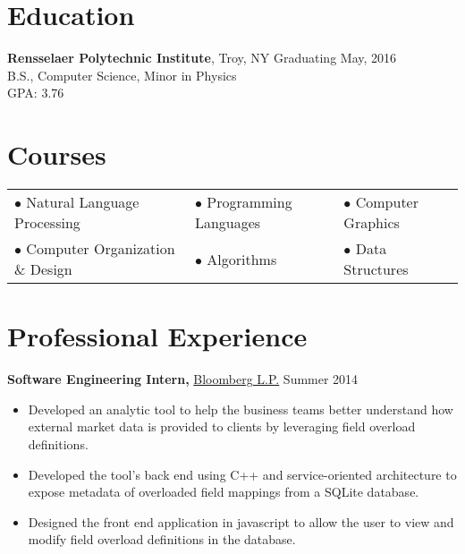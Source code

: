 \documentclass[margin]{res}
\begin{document}
 
\begin{minipage}{\textwidth}

 
\address{{\bf Present Address} \\ 2166 14th St \\ 2nd Floor \\ Troy, NY 12180 }
\address{{\bf Permanent Address} \\ 4 Oak Street \\ Cumberland, ME 04021 }
\begin{resume} 
 
\section{Education} 
{\bf Rensselaer Polytechnic Institute}, Troy, NY \hfill Graduating May, 2016 \\
B.S., Computer Science, Minor in Physics \\
GPA: 3.76
 
\section{Courses}
\begin{tabular}{lll}
$\bullet$ Natural Language Processing & $\bullet$ Programming Languages & $\bullet$ Computer Graphics \\
$\bullet$ Computer Organization \& Design & $\bullet$ Algorithms & $\bullet$ Data Structures \\
\end{tabular}

\section{Professional Experience}
{\bf Software Engineering Intern,} \uline{Bloomberg L.P.} \hfill Summer 2014
 \begin{itemize} \itemsep -2pt
 \item Developed an analytic tool to help the business teams better understand how external market data is provided to clients by leveraging field overload definitions.
 \item Developed the tool's back end using C++ and service-oriented architecture to expose metadata of overloaded field mappings from a SQLite database.
 \item Designed the front end application in javascript to allow the user to view and modify field overload definitions in the database.
 \end{itemize}




\end{resume}
\end{minipage}
\end{document}
